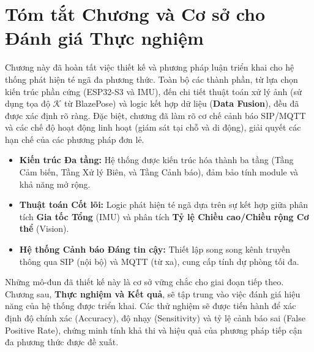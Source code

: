 \section{Tóm tắt Chương và Cơ sở cho Đánh giá Thực nghiệm}
\label{sec:methodology_conclusion} %

Chương này đã hoàn tất việc thiết kế và phương pháp luận triển khai cho hệ thống phát hiện té ngã đa phương thức. Toàn bộ các thành phần, từ lựa chọn kiến trúc phần cứng (ESP32-S3 và IMU), đến chi tiết thuật toán xử lý ảnh (sử dụng tọa độ $\mathcal{K}$ từ BlazePose) và logic kết hợp dữ liệu (\textbf{Data Fusion}), đều đã được xác định rõ ràng. Đặc biệt, chương đã làm rõ cơ chế cảnh báo SIP/MQTT và các chế độ hoạt động linh hoạt (giám sát tại chỗ và di động), giải quyết các hạn chế của các phương pháp đơn lẻ.

\begin{itemize}
    \item \textbf{Kiến trúc Đa tầng:} Hệ thống được kiến trúc hóa thành ba tầng (Tầng Cảm biến, Tầng Xử lý Biên, và Tầng Cảnh báo), đảm bảo tính module và khả năng mở rộng.
    \item \textbf{Thuật toán Cốt lõi:} Logic phát hiện té ngã dựa trên sự kết hợp giữa phân tích \textbf{Gia tốc Tổng} (IMU) và phân tích \textbf{Tỷ lệ Chiều cao/Chiều rộng Cơ thể} (Vision).
    \item \textbf{Hệ thống Cảnh báo Đáng tin cậy:} Thiết lập song song kênh truyền thông qua SIP (nội bộ) và MQTT (từ xa), cung cấp tính dự phòng tối đa.
\end{itemize}

Những mô-đun đã thiết kế này là cơ sở vững chắc cho giai đoạn tiếp theo. Chương sau, \textbf{Thực nghiệm và Kết quả}, sẽ tập trung vào việc đánh giá hiệu năng của hệ thống được triển khai. Các thử nghiệm sẽ được tiến hành để xác định độ chính xác (Accuracy), độ nhạy (Sensitivity) và tỷ lệ cảnh báo sai (False Positive Rate), chứng minh tính khả thi và hiệu quả của phương pháp tiếp cận đa phương thức được đề xuất.
